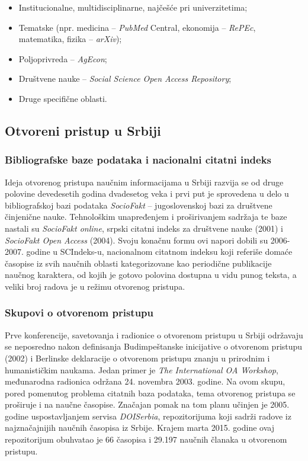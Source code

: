 \documentclass{article}
\begin{document}
\begin{itemize}
    \item Institucionalne, multidisciplinarne, najčešće pri univerzitetima;
    \item Tematske (npr. medicina – \textit{PubMed} Central, ekonomija – \textit{RePEc}, matematika, fizika – \textit{arXiv});
    \item Poljoprivreda – \textit{AgEcon};
    \item Društvene nauke – \textit{Social Science Open Access Repository};
    \item Druge specifične oblasti.
\end{itemize}

\subsection{Otvoreni pristup u Srbiji}

\subsubsection{Bibliografske baze podataka i nacionalni citatni indeks}

Ideja otvorenog pristupa naučnim informacijama u Srbiji razvija se od druge polovine devedesetih godina dvadesetog veka i prvi put je sprovedena u delo u bibliografskoj bazi podataka \textit{SocioFakt} – jugoslovenskoj bazi za društvene činjenične nauke\cite{sevkusic2017open}. Tehnološkim unapređenjem i proširivanjem sadržaja te baze nastali su \textit{SocioFakt online}, srpski citatni indeks za društvene nauke (2001) i \textit{SocioFakt Open Access} (2004). Svoju konačnu formu ovi napori dobili su 2006-2007. godine u SCIndeks-u, nacionalnom citatnom indeksu koji referiše domaće časopise iz svih naučnih oblasti kategorizovane kao periodične publikacije naučnog karaktera, od kojih je gotovo polovina dostupna u vidu punog teksta, a veliki broj radova je u režimu otvorenog pristupa\cite{sevkusic2017open}.

\subsubsection{Skupovi o otvorenom pristupu}

Prve konferencije, savetovanja i radionice o otvorenom pristupu u Srbiji održavaju se neposredno nakon definisanja Budimpeštanske inicijative o otvorenom pristupu (2002) i Berlinske deklaracije o otvorenom pristupu znanju u prirodnim i humanističkim naukama. Jedan primer je \textit{The International OA Workshop}, međunarodna radionica održana 24. novembra 2003. godine\cite{sevkusic2017open}. Na ovom skupu, pored pomenutog problema citatnih baza podataka, tema otvorenog pristupa se proširuje i na naučne časopise. Značajan pomak na tom planu učinjen je 2005. godine uspostavljanjem servisa \textit{DOISerbia}, repozitorijuma koji sadrži radove iz najznačajnijih naučnih časopisa iz Srbije. Krajem marta 2015. godine ovaj repozitorijum obuhvatao je 66 časopisa i 29.197 naučnih članaka u otvorenom pristupu\cite{oaSerbia}.
\end{document}

